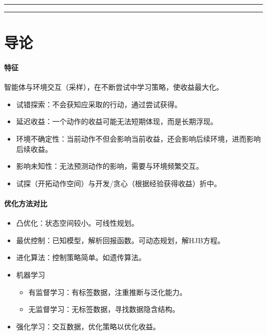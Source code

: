 \documentclass[
12pt, %
a4paper, 
oneside, %
headinclude,footinclude, %
]{scrartcl}
\title{\normalfont\spacedallcaps{强化学习}}
\date{}
\begin{document}
\maketitle
\newpage
\hypertarget{toc}{}
\begingroup
\begin{multicols}{2}
\tableofcontents
\end{multicols}
\endgroup
\newpage
\begingroup
\begin{multicols}{2}
\listoffigures
\end{multicols}
\endgroup
\hrule
\begingroup
\begin{multicols}{2}
\listoftables
\end{multicols}
\endgroup
\hrule
\begingroup
\begin{multicols}{2}
\listofalgorithms
\end{multicols}
\endgroup
\newpage
\begingroup
\begin{multicols}{2}
\listoftips
\end{multicols}
\endgroup
\newpage
\section{导论}
\paragraph{特征}
智能体与环境交互（采样），在不断尝试中学习策略，使收益最大化。
\begin{itemize}
\item 试错探索：不会获知应采取的行动，通过尝试获得。
\item 延迟收益：一个动作的收益可能无法短期体现，而是长期浮现。
\item 环境不确定性：当前动作不但会影响当前收益，还会影响后续环境，进而影响后续收益。
\item 影响未知性：无法预测动作的影响，需要与环境频繁交互。
\item 试探（开拓动作空间）与开发/贪心（根据经验获得收益）折中。
\end{itemize}
\paragraph{优化方法对比}
\begin{itemize}
\item 凸优化：状态空间较小。可线性规划。
\item 最优控制：已知模型，解析回报函数。可动态规划，解HJB方程。
\item 进化算法：控制策略简单。如遗传算法。
\item 机器学习
\begin{itemize}
\item 有监督学习：有标签数据，注重推断与泛化能力。
\item 无监督学习：无标签数据，寻找数据隐含结构。
\end{itemize}
\item 强化学习：交互数据，优化策略以优化收益。
\end{itemize}
\end{document}
